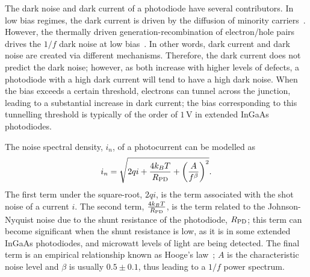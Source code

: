 \par
The dark noise and dark current of a photodiode have several contributors. In low bias regimes, the dark current is driven by the diffusion of minority carriers~\cite{DextquotesingleHondt,Forrest1981}. However, the thermally driven generation-recombination of electron/hole pairs drives the $1/f$ dark noise at low bias~\cite{Hooge1981}. In other words, dark current and dark noise are created via different mechanisms. Therefore, the dark current does not predict the dark noise; however, as both increase with higher levels of defects, a photodiode with a high dark current will tend to have a high dark noise. When the bias exceeds a certain threshold, electrons can tunnel across the junction, leading to a substantial increase in dark current; the bias corresponding to this tunnelling threshold is typically of the order of $1\,\si{\volt}$ in extended InGaAs photodiodes.
\par
The noise spectral density, $i_n$, of a photocurrent can be modelled as
\begin{equation}
i_n = \sqrt{ 2qi + \frac{4k_BT}{R_{\rm{PD}}} + \left(\frac{A}{f^{\beta}}\right)^2 }.
\end{equation}
The first term under the square-root, $2qi$, is the term associated with the shot noise of a current $i$. The second term, $ \frac{4k_BT}{R_{\rm{PD}}}$, is the term related to the Johnson-Nyquist noise due to the shunt resistance of the photodiode, $R_{\rm{PD}}$; this term can become significant when the shunt resistance is low, as it is in some extended InGaAs photodiodes, and microwatt levels of light are being detected. The final term is an empirical relationship known as Hooge's law~\cite{Hooge1981}; $A$ is the characteristic noise level and $\beta$ is usually $0.5\pm0.1$, thus leading to a $1/f$ power spectrum.
